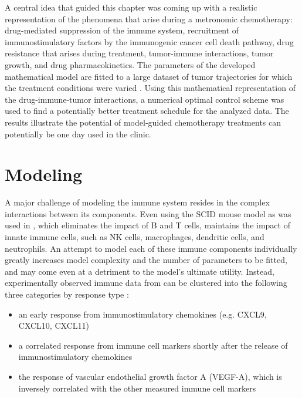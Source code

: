 A central idea that guided this chapter was coming up with a realistic representation of the phenomena that arise during a metronomic chemotherapy: drug-mediated suppression of the immune system, recruitment of immunostimulatory factors by the immunogenic cancer cell death pathway, drug resistance that arises during treatment, tumor-immune interactions, tumor growth, and drug pharmacokinetics. The parameters of the developed mathematical model are fitted to a large dataset of tumor trajectories for which the treatment conditions were varied \cite{wu2014metronomic}. Using this mathematical representation of the drug-immune-tumor interactions, a numerical optimal control scheme was used to find a potentially better treatment schedule for the analyzed data. The results illustrate the potential of model-guided chemotherapy treatments can potentially be one day used in the clinic.

\section{Modeling}

A major challenge of modeling the immune system resides in the complex interactions between its components. Even using the \ac{SCID} mouse model as was used in  \cite{wu2014metronomic}, which eliminates the impact of B and T cells, maintains the impact of innate immune cells, such as NK cells, macrophages, dendritic cells, and neutrophils. An attempt to model each of these immune components individually greatly increases  model complexity and the number of parameters to be fitted, and may come even at a detriment to the model's ultimate utility. Instead, experimentally observed immune data from \cite{wu2014metronomic} can be clustered into the following three categories by response type :
\begin{itemize}
	\item an early response from immunostimulatory chemokines (e.g. CXCL9, CXCL10, CXCL11)
	\item a correlated response from immune cell markers shortly after the release of immunostimulatory chemokines
	\item the response of vascular endothelial growth factor A (VEGF-A), which is inversely correlated with the other measured immune cell markers
\end{itemize}

